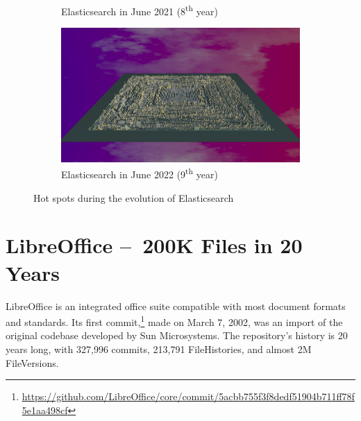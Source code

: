 \begin{figure}[ht]
\begin{subfigure}{0.48\textwidth}
        \caption{Elasticsearch in June 2021 (8\textsuperscript{th} year)} 
        \label{fig:Elastic_V5_S5}
    \end{subfigure}\hspace*{\fill}
    \begin{subfigure}{0.48\textwidth}
        \includegraphics[width=\linewidth]{Elasticsearch/Animation009.png}
        \caption{Elasticsearch in June 2022 (9\textsuperscript{th} year)} 
        \label{fig:Elastic_V5_S6}
    \end{subfigure}
    
    \caption{Hot spots during the evolution of Elasticsearch} 
    \label{fig:Elastic_V5}
\end{figure}


\clearpage
\section{LibreOffice – 200K Files in 20 Years}
LibreOffice is an integrated office suite compatible with most document formats and standards. Its first commit,\footnote{\url{https://github.com/LibreOffice/core/commit/5acbb755f3f8dedf51904b711ff78f5e1aa498cf}} made on March 7, 2002, was an import of the original codebase developed by Sun Microsystems. The repository's history is 20 years long, with 327,996 commits, 213,791 FileHistories, and almost 2M FileVersions. 

